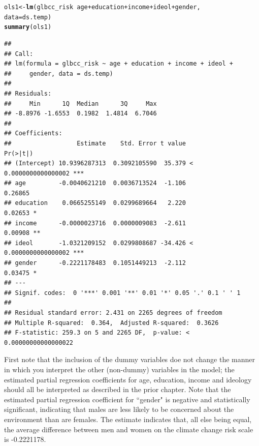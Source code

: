 \documentclass[11pt,openany]{book}\usepackage[]{graphicx}\usepackage[]{color}
\makeatletter
\newcommand{\hlopt}[1]{\textcolor[rgb]{0,0,0}{#1}}%
\newcommand{\hlstd}[1]{\textcolor[rgb]{0.345,0.345,0.345}{#1}}%
\newcommand{\hlkwb}[1]{\textcolor[rgb]{0.69,0.353,0.396}{#1}}%
\newcommand{\hlkwc}[1]{\textcolor[rgb]{0.333,0.667,0.333}{#1}}%
\newcommand{\hlkwd}[1]{\textcolor[rgb]{0.737,0.353,0.396}{\textbf{#1}}}%
\newenvironment{kframe}{%
 \def\at@end@of@kframe{}%
 \ifinner\ifhmode%
  \def\at@end@of@kframe{\end{minipage}}%
  \begin{minipage}{\columnwidth}%
 \fi\fi%
 \def\FrameCommand##1{\hskip\@totalleftmargin \hskip-\fboxsep
 \colorbox{shadecolor}{##1}\hskip-\fboxsep
     \hskip-\linewidth \hskip-\@totalleftmargin \hskip\columnwidth}%
 \MakeFramed {\advance\hsize-\width
   \@totalleftmargin\z@ \linewidth\hsize
   \@setminipage}}%
 {\par\unskip\endMakeFramed%
 \at@end@of@kframe}
\newenvironment{knitrout}{}{} %
\renewenvironment{knitrout}{\begin{singlespace}}{\end{singlespace}}
\makeatother
\begin{document}
\begin{knitrout}
\color{fgcolor}\begin{kframe}
\begin{alltt}
\hlstd{ols1} \hlkwb{<-} \hlkwd{lm}\hlstd{(glbcc_risk} \hlopt{~} \hlstd{age} \hlopt{+} \hlstd{education} \hlopt{+} \hlstd{income} \hlopt{+} \hlstd{ideol} \hlopt{+} \hlstd{gender,}
    \hlkwc{data} \hlstd{= ds.temp)}
\hlkwd{summary}\hlstd{(ols1)}
\end{alltt}
\begin{verbatim}
## 
## Call:
## lm(formula = glbcc_risk ~ age + education + income + ideol + 
##     gender, data = ds.temp)
## 
## Residuals:
##     Min      1Q  Median      3Q     Max 
## -8.8976 -1.6553  0.1982  1.4814  6.7046 
## 
## Coefficients:
##                  Estimate    Std. Error t value             Pr(>|t|)    
## (Intercept) 10.9396287313  0.3092105590  35.379 < 0.0000000000000002 ***
## age         -0.0040621210  0.0036713524  -1.106              0.26865    
## education    0.0665255149  0.0299689664   2.220              0.02653 *  
## income      -0.0000023716  0.0000009083  -2.611              0.00908 ** 
## ideol       -1.0321209152  0.0299808687 -34.426 < 0.0000000000000002 ***
## gender      -0.2221178483  0.1051449213  -2.112              0.03475 *  
## ---
## Signif. codes:  0 '***' 0.001 '**' 0.01 '*' 0.05 '.' 0.1 ' ' 1
## 
## Residual standard error: 2.431 on 2265 degrees of freedom
## Multiple R-squared:  0.364,	Adjusted R-squared:  0.3626 
## F-statistic: 259.3 on 5 and 2265 DF,  p-value: < 0.00000000000000022
\end{verbatim}
\end{kframe}
\end{knitrout}
First note that the inclusion of the dummy variables doe not change the manner in which you interpret the other (non-dummy) variables in the model; the estimated partial regression coefficients for age, education, income and ideology should all be interpreted as described in the prior chapter. Note that the estimated partial regression coefficient for ``gender" is negative and statistically significant, indicating that males are less likely to be concerned about the environment than are females. The estimate indicates that, all else being equal, the average difference between men and women on the climate change risk scale is -0.2221178. 

\end{document}
